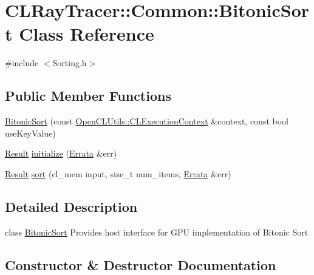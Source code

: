\hypertarget{class_c_l_ray_tracer_1_1_common_1_1_bitonic_sort}{}\section{C\+L\+Ray\+Tracer\+:\+:Common\+:\+:Bitonic\+Sort Class Reference}
\label{class_c_l_ray_tracer_1_1_common_1_1_bitonic_sort}


{\ttfamily \#include $<$Sorting.\+h$>$}

\subsection*{Public Member Functions}
\begin{DoxyCompactItemize}
\item 
\hyperlink{class_c_l_ray_tracer_1_1_common_1_1_bitonic_sort_afa3186a254bf1cc88bd5582f1ebc7f07}{Bitonic\+Sort} (const \hyperlink{class_c_l_ray_tracer_1_1_open_c_l_utils_1_1_c_l_execution_context}{Open\+C\+L\+Utils\+::\+C\+L\+Execution\+Context} \&context, const bool use\+Key\+Value)
\item 
\hyperlink{_errata_8h_a389396702f1aff6e71eb21328b0775c1}{Result} \hyperlink{class_c_l_ray_tracer_1_1_common_1_1_bitonic_sort_aa83725de0e4456f34f231efa8180adba}{initialize} (\hyperlink{class_c_l_ray_tracer_1_1_common_1_1_errata}{Errata} \&err)
\item 
\hyperlink{_errata_8h_a389396702f1aff6e71eb21328b0775c1}{Result} \hyperlink{class_c_l_ray_tracer_1_1_common_1_1_bitonic_sort_aef90e35777db561268d214d31104a160}{sort} (cl\+\_\+mem input, size\+\_\+t num\+\_\+items, \hyperlink{class_c_l_ray_tracer_1_1_common_1_1_errata}{Errata} \&err)
\end{DoxyCompactItemize}


\subsection{Detailed Description}
class \hyperlink{class_c_l_ray_tracer_1_1_common_1_1_bitonic_sort}{Bitonic\+Sort} Provides host interface for G\+PU implementation of Bitonic Sort 

\subsection{Constructor \& Destructor Documentation}
